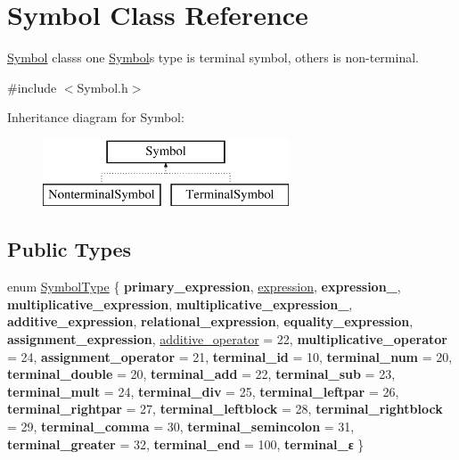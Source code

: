 \hypertarget{class_symbol}{}\section{Symbol Class Reference}
\label{class_symbol}


\hyperlink{class_symbol}{Symbol} class\textquotesingle{}s one \hyperlink{class_symbol}{Symbol}\textquotesingle{}s type is terminal symbol, other\textquotesingle{}s is non-\/terminal.  




{\ttfamily \#include $<$Symbol.\+h$>$}

Inheritance diagram for Symbol\+:\begin{figure}[H]
\begin{center}
\leavevmode
\includegraphics[height=2.000000cm]{class_symbol}
\end{center}
\end{figure}
\subsection*{Public Types}
\begin{DoxyCompactItemize}
\item 
enum \hyperlink{class_symbol_a7ee37d4cfcb980f4eddf7ed1a028da5a}{Symbol\+Type} \{ \newline
{\bfseries primary\+\_\+expression}, 
\hyperlink{class_symbol_a7ee37d4cfcb980f4eddf7ed1a028da5aa8661510d8a27e67fc96161d1c67289bd}{expression}, 
{\bfseries expression\+\_\+}, 
{\bfseries multiplicative\+\_\+expression}, 
\newline
{\bfseries multiplicative\+\_\+expression\+\_\+}, 
{\bfseries additive\+\_\+expression}, 
{\bfseries relational\+\_\+expression}, 
{\bfseries equality\+\_\+expression}, 
\newline
{\bfseries assignment\+\_\+expression}, 
\hyperlink{class_symbol_a7ee37d4cfcb980f4eddf7ed1a028da5aa3db3ca894c8b0c7c2a94e4bef890032b}{additive\+\_\+operator} = 22, 
{\bfseries multiplicative\+\_\+operator} = 24, 
{\bfseries assignment\+\_\+operator} = 21, 
\newline
{\bfseries terminal\+\_\+id} = 10, 
{\bfseries terminal\+\_\+num} = 20, 
{\bfseries terminal\+\_\+double} = 20, 
{\bfseries terminal\+\_\+add} = 22, 
\newline
{\bfseries terminal\+\_\+sub} = 23, 
{\bfseries terminal\+\_\+mult} = 24, 
{\bfseries terminal\+\_\+div} = 25, 
{\bfseries terminal\+\_\+leftpar} = 26, 
\newline
{\bfseries terminal\+\_\+rightpar} = 27, 
{\bfseries terminal\+\_\+leftblock} = 28, 
{\bfseries terminal\+\_\+rightblock} = 29, 
{\bfseries terminal\+\_\+comma} = 30, 
\newline
{\bfseries terminal\+\_\+semincolon} = 31, 
{\bfseries terminal\+\_\+greater} = 32, 
{\bfseries terminal\+\_\+end} = 100, 
{\bfseries terminal\+\_\+ε}
 \}
\end{DoxyCompactItemize}
